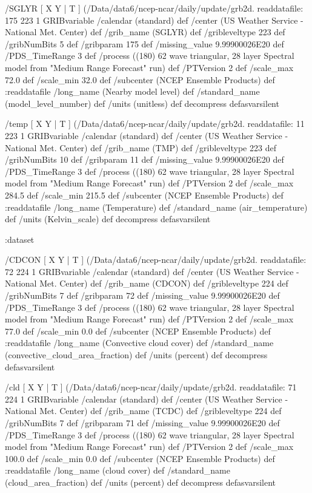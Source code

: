 \begin{ingrid}
   /SGLYR { [ X Y | T ] (/Data/data6/ncep-ncar/daily/update/grb2d.%
   readdatafile:
   175 223 1 GRIBvariable
   /calendar (standard) def
   /center (US Weather Service - National Met. Center) def
   /grib_name (SGLYR) def
   /gribleveltype 223 def
   /gribNumBits 5 def
   /gribparam 175 def
   /missing_value 9.99900026E20 def
   /PDS_TimeRange 3 def
   /process ((180) 62 wave triangular, 28 layer Spectral model from "Medium Range Forecast" run) def
   /PTVersion 2 def
   /scale_max 72.0 def
   /scale_min 32.0 def
   /subcenter (NCEP Ensemble Products) def
   :readdatafile
   /long_name (Nearby model level) def
   /standard_name (model_level_number) def
   /units (unitless) def
   decompress
   } defasvarsilent

   /temp { [ X Y | T ] (/Data/data6/ncep-ncar/daily/update/grb2d.%
   readdatafile:
   11 223 1 GRIBvariable
   /calendar (standard) def
   /center (US Weather Service - National Met. Center) def
   /grib_name (TMP) def
   /gribleveltype 223 def
   /gribNumBits 10 def
   /gribparam 11 def
   /missing_value 9.99900026E20 def
   /PDS_TimeRange 3 def
   /process ((180) 62 wave triangular, 28 layer Spectral model from "Medium Range Forecast" run) def
   /PTVersion 2 def
   /scale_max 284.5 def
   /scale_min 215.5 def
   /subcenter (NCEP Ensemble Products) def
   :readdatafile
   /long_name (Temperature) def
   /standard_name (air_temperature) def
   /units (Kelvin_scale) def
   decompress
   } defasvarsilent

  :dataset

  /CDCON { [ X Y | T ] (/Data/data6/ncep-ncar/daily/update/grb2d.%
  readdatafile:
  72 224 1 GRIBvariable
  /calendar (standard) def
  /center (US Weather Service - National Met. Center) def
  /grib_name (CDCON) def
  /gribleveltype 224 def
  /gribNumBits 7 def
  /gribparam 72 def
  /missing_value 9.99900026E20 def
  /PDS_TimeRange 3 def
  /process ((180) 62 wave triangular, 28 layer Spectral model from "Medium Range Forecast" run) def
  /PTVersion 2 def
  /scale_max 77.0 def
  /scale_min 0.0 def
  /subcenter (NCEP Ensemble Products) def
  :readdatafile
  /long_name (Convective cloud cover) def
  /standard_name (convective_cloud_area_fraction) def
  /units (percent) def
  decompress
  } defasvarsilent

  /cld { [ X Y | T ] (/Data/data6/ncep-ncar/daily/update/grb2d.%
  readdatafile:
  71 224 1 GRIBvariable
  /calendar (standard) def
  /center (US Weather Service - National Met. Center) def
  /grib_name (TCDC) def
  /gribleveltype 224 def
  /gribNumBits 7 def
  /gribparam 71 def
  /missing_value 9.99900026E20 def
  /PDS_TimeRange 3 def
  /process ((180) 62 wave triangular, 28 layer Spectral model from "Medium Range Forecast" run) def
  /PTVersion 2 def
  /scale_max 100.0 def
  /scale_min 0.0 def
  /subcenter (NCEP Ensemble Products) def
  :readdatafile
  /long_name (cloud cover) def
  /standard_name (cloud_area_fraction) def
  /units (percent) def
  decompress
  } defasvarsilent


\end{ingrid}

